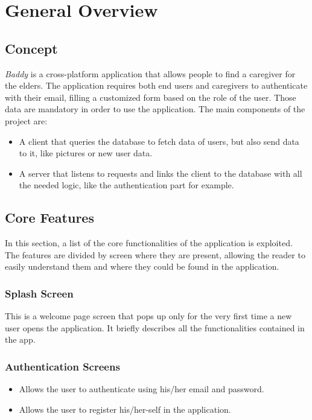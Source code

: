 \documentclass[../../dd.tex]{subfiles}
\begin{document}
\chapter{General Overview}
\section{Concept}
    \textit{Baddy} is a cross-platform application that allows people to find a caregiver for the elders.
    The application requires both end users and caregivers to authenticate with their email, filling a customized form
    based on the role of the user.
    Those data are mandatory in order to use the application.
    The main components of the project are:
    \begin{itemize}
        \item A client that queries the database to fetch data of users, but also send data to it,
        like pictures or new user data.
        \item A server that listens to requests and links the client to the database with all the needed logic, like
        the authentication part for example.
    \end{itemize}
\section{Core Features}
    In this section, a list of the core functionalities of the application is exploited.
    The features are divided by screen where they are present, allowing the reader
    to easily understand them and where they could be found in the application.
    \subsection{Splash Screen}
    This is a welcome page screen that pops up only for the very first time a new user opens the application.
    It briefly describes all the functionalities contained in the app.

    \subsection{Authentication Screens}
    \begin{itemize}
        \item Allows the user to authenticate using his/her email and password.
        \item Allows the user to register his/her-self in the application.
    \end{itemize}
\end{document}
